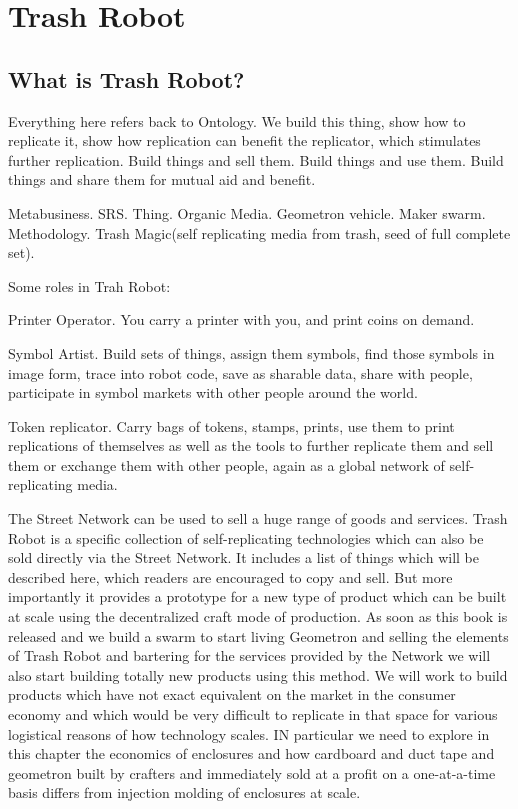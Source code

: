 \section{Trash Robot}

\subsection{What is Trash Robot?}

Everything here refers back to Ontology.  We build this thing, show how to replicate it, show how replication can benefit the replicator, which stimulates further replication.  Build things and sell them. Build things and use them. Build things and share them for mutual aid and benefit. 

Metabusiness.  SRS.  Thing.  Organic Media. Geometron vehicle.  Maker swarm. Methodology.  Trash Magic(self replicating media from trash, seed of full complete set).


Some roles in Trah Robot:

Printer Operator.  You carry a printer with you, and print coins on demand.

Symbol Artist.  Build sets of things, assign them symbols, find those symbols in image form, trace into robot code, save as sharable data, share with people, participate in symbol markets with other people around the world. 

Token replicator.  Carry bags of tokens, stamps, prints, use them to print replications of themselves as well as the tools to further replicate them and sell them or exchange them with other people, again as a global network of self-replicating media.


The Street Network can be used to sell a huge range of goods and services.  Trash Robot is a specific collection of self-replicating technologies which can also be sold directly via the Street Network.  It includes a list of things which will be described here, which readers are encouraged to copy and sell.  But more importantly it provides a prototype for a new type of product which can be built at scale using the decentralized craft mode of production.  As soon as this book is released and we build a swarm to start living Geometron and selling the elements of Trash Robot and bartering for the services provided by the Network we will also start building totally new products using this method.  We will work to build products which have not exact equivalent on the market in the consumer economy and which would be very difficult to replicate in that space for various logistical reasons of how technology scales.   IN particular we need to explore in this chapter the economics of enclosures and how cardboard and duct tape and geometron built by crafters and immediately sold at a profit on a one-at-a-time basis differs from injection molding of enclosures at scale.  

